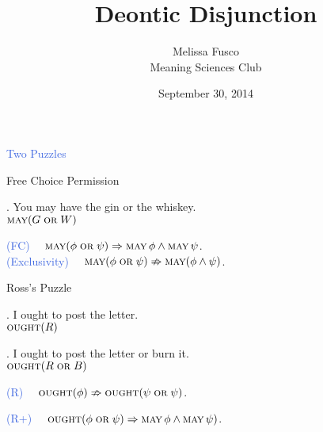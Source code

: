\documentclass[xcolor=dvipsnames]{beamer}
\title{Deontic Disjunction}
\author[Melissa Fusco]{Melissa Fusco \\ Meaning Sciences Club}
\date{September 30, 2014}
\newcommand{\dor}{\mathrel{\text{\sc{or}}}}
\newcommand{\May}{\mathop{\text{\sc{may}}}}
\newcommand{\Ought}{\mathop{\text{\sc{ought}}}}
\begin{document}
\begin{frame}[plain]
  \titlepage
\end{frame}

\begin{frame}
\begin{center}
{\LARGE \textcolor{RoyalBlue}{Two Puzzles}}
\end{center}
\end{frame}


\begin{frame}{Free Choice Permission}
\begin{center}
\ex. You may have the gin or the whiskey.\\
$\May (G \dor W)$ \label{gin} \\ 

\vspace{30pt}
\pause

 \textcolor{RoyalBlue}{(FC)} $\quad \May(\phi \dor \psi) \Rightarrow \May \phi \wedge \May \psi$. \\ 
 \vspace{10pt}
 \pause
  \textcolor{RoyalBlue}{(Exclusivity)} $\quad \May(\phi \dor \psi) \nRightarrow \May (\phi \wedge \psi)$. 
    \end{center}
    \end{frame}

\begin{frame}{Ross's Puzzle}
\begin{center}
  \ex. I ought to post the letter. \\
$\Ought (R)$ \label{post} \\ 

\pause

\ex. I ought to post the letter or burn it. \\
$\Ought (R \dor B)$ \label{burn} \\ 


\vspace{30pt}
\pause

 \textcolor{RoyalBlue}{(R)} $\quad \Ought(\phi) \nRightarrow \Ought(\psi \dor \psi)$. \\ 
 \vspace{10pt}
 
 \pause
 
  \textcolor{RoyalBlue}{(R+)} $\quad \Ought(\phi \dor \psi) \Rightarrow \May \phi \wedge \May \psi)$. 
    \end{center}
    \end{frame}
\end{document}
